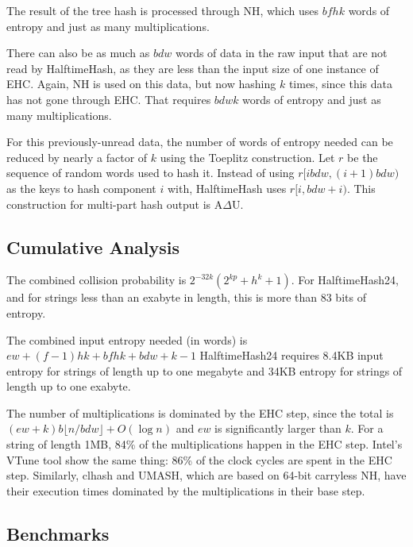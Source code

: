 \documentclass{llncs}
\newcommand{\ints}{\mathbb{Z}}
\begin{document}
The result of the tree hash is processed through NH, which uses $b f h k$ words of entropy and just as many multiplications.

There can also be as much as $b d w$ words of data in the raw input that are not read by HalftimeHash, as they are less than the input size of one instance of EHC.
Again, NH is used on this data, but now hashing $k$ times, since this data has not gone through EHC.
That requires $b d w k$ words of entropy and just as many multiplications.

For this previously-unread data, the number of words of entropy needed can be reduced by nearly a factor of $k$ using the Toeplitz construction.
Let $r$ be the sequence of random words used to hash it.
Instead of using $r[i b d w, (i+1)b d w)$ as the keys to hash component $i$ with, HalftimeHash uses $r[i, b d w + i)$.
This construction for multi-part hash output is A$\Delta$U. \cite{ehc-nandi,woelfel-toeplitz}

\subsection{Cumulative Analysis}

The combined collision probability is
$2^{-32k}\left(2^{kp} + h^k + 1\right)$.
For HalftimeHash24, and for strings less than an exabyte in length, this is more than 83 bits of entropy.

The combined input entropy needed (in words) is
$
e w
+ (f-1) h k
+ b f h k
+ b d w + k - 1
$
HalftimeHash24 requires 8.4KB input entropy for strings of length up to one megabyte and 34KB entropy for strings of length up to one exabyte.

The number of multiplications is dominated by the EHC step, since the total is $(e w + k) b \lfloor n / b d w \rfloor + O(\log n)$ and $e w$ is significantly larger than $k$.
For a string of length 1MB, 84\% of the multiplications happen in the EHC step. %
Intel's VTune tool show the same thing: 86\% of the clock cycles are spent in the EHC step.
Similarly, clhash and UMASH, which are based on 64-bit carryless NH, have their execution times dominated by the multiplications in their base step.~\cite{clhash,umash}

\subsection{Benchmarks}
\label{benchmarks}
\end{document}
